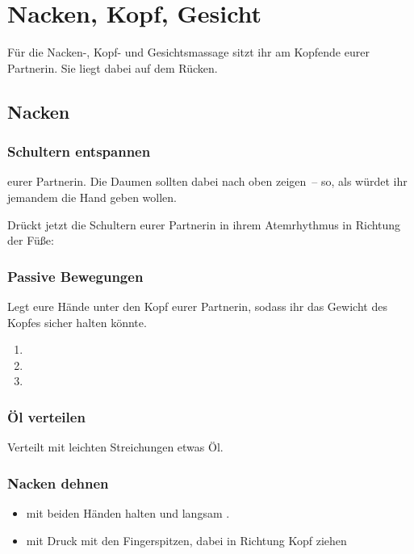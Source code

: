 \section{Nacken, Kopf, Gesicht}

Für die Nacken-, Kopf- und Gesichtsmassage sitzt ihr am Kopfende eurer Partnerin. Sie liegt dabei auf dem Rücken.

\subsection{Nacken}

\subsubsection{Schultern entspannen}
 eurer Partnerin. Die Daumen sollten dabei nach oben zeigen~-- so, als würdet ihr jemandem die Hand geben wollen.

Drückt jetzt die Schultern eurer Partnerin in ihrem Atemrhythmus in Richtung der Füße: 

\subsubsection{Passive Bewegungen}

Legt eure Hände unter den Kopf eurer Partnerin, sodass ihr das Gewicht des Kopfes sicher halten könnte.

\begin{enumerate}
  \item {}
  \item {}
  \item {}
\end{enumerate}

\subsubsection{Öl verteilen}

Verteilt mit leichten Streichungen etwas Öl.

\subsubsection{Nacken dehnen}
\begin{itemize}
  \item {} mit beiden Händen halten und langsam .
  \item {} mit Druck mit den Fingerspitzen, dabei in Richtung Kopf ziehen
\end{itemize}

